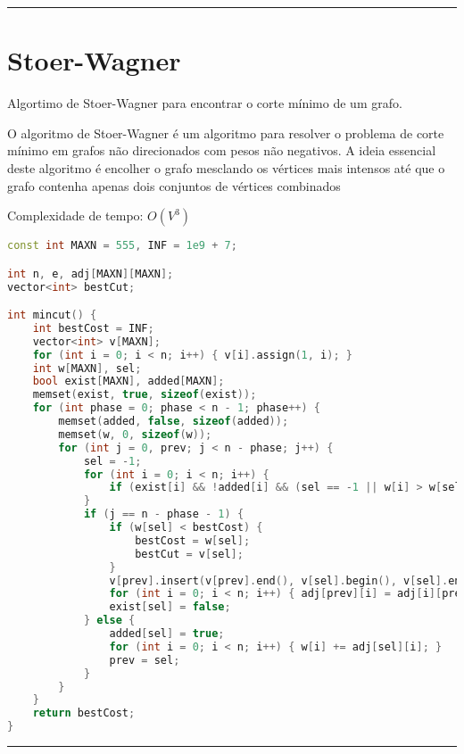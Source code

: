 \documentclass[11pt, a4paper, twoside]{book}
\begin{document}
\hfill

\rule{\textwidth}{0.4pt}

\section{Stoer-Wagner}



Algortimo de Stoer-Wagner para encontrar o corte mínimo de um grafo.



O algoritmo de Stoer-Wagner é um algoritmo para resolver o problema de corte mínimo em grafos não direcionados com pesos não negativos. A ideia essencial deste algoritmo é encolher o grafo mesclando os vértices mais intensos até que o grafo contenha apenas dois conjuntos de vértices combinados



Complexidade de tempo: $O(V^3)$


\hfill

\begin{lstlisting}[language=C++]
const int MAXN = 555, INF = 1e9 + 7;

int n, e, adj[MAXN][MAXN];
vector<int> bestCut;

int mincut() {
    int bestCost = INF;
    vector<int> v[MAXN];
    for (int i = 0; i < n; i++) { v[i].assign(1, i); }
    int w[MAXN], sel;
    bool exist[MAXN], added[MAXN];
    memset(exist, true, sizeof(exist));
    for (int phase = 0; phase < n - 1; phase++) {
        memset(added, false, sizeof(added));
        memset(w, 0, sizeof(w));
        for (int j = 0, prev; j < n - phase; j++) {
            sel = -1;
            for (int i = 0; i < n; i++) {
                if (exist[i] && !added[i] && (sel == -1 || w[i] > w[sel])) { sel = i; }
            }
            if (j == n - phase - 1) {
                if (w[sel] < bestCost) {
                    bestCost = w[sel];
                    bestCut = v[sel];
                }
                v[prev].insert(v[prev].end(), v[sel].begin(), v[sel].end());
                for (int i = 0; i < n; i++) { adj[prev][i] = adj[i][prev] += adj[sel][i]; }
                exist[sel] = false;
            } else {
                added[sel] = true;
                for (int i = 0; i < n; i++) { w[i] += adj[sel][i]; }
                prev = sel;
            }
        }
    }
    return bestCost;
}
\end{lstlisting}

\hfill

\rule{\textwidth}{0.4pt}
\end{document}
